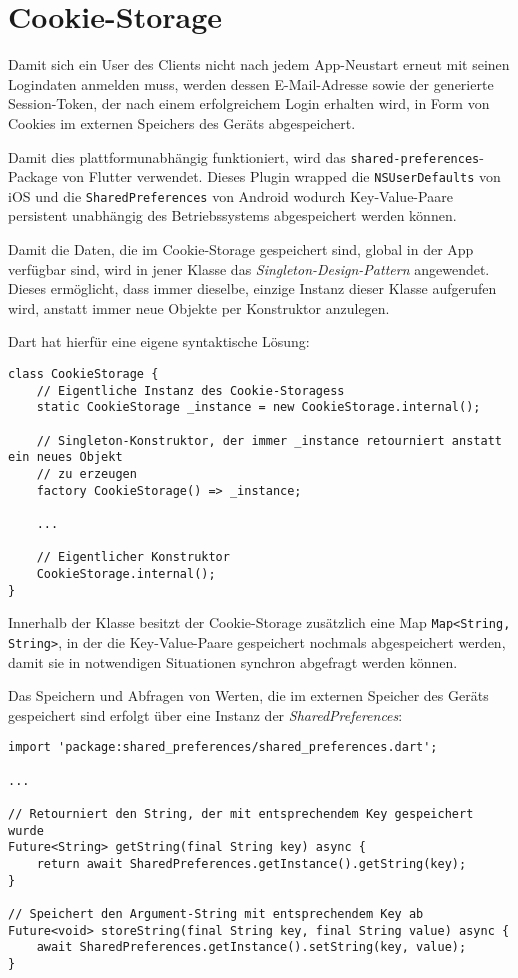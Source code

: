 \section{Cookie-Storage}

Damit sich ein User des Clients nicht nach jedem App-Neustart erneut mit seinen Logindaten anmelden muss,
werden dessen E-Mail-Adresse sowie der generierte Session-Token, der nach einem erfolgreichem Login erhalten wird, 
in Form von Cookies im externen Speichers des Geräts abgespeichert.


Damit dies plattformunabhängig funktioniert, wird das \lstinline{shared-preferences}-Package von Flutter
verwendet.
Dieses Plugin wrapped die \lstinline{NSUserDefaults} von iOS und die \lstinline{SharedPreferences} von Android
wodurch Key-Value-Paare persistent unabhängig des Betriebssystems abgespeichert werden können.

Damit die Daten, die im Cookie-Storage gespeichert sind, global in der App verfügbar sind, wird in jener
Klasse das \textit{Singleton-Design-Pattern} angewendet. Dieses ermöglicht, dass immer dieselbe, einzige Instanz
dieser Klasse aufgerufen wird, anstatt immer neue Objekte per Konstruktor anzulegen.

Dart hat hierfür eine eigene syntaktische Lösung:

\begin{lstlisting}
class CookieStorage {
    // Eigentliche Instanz des Cookie-Storagess
    static CookieStorage _instance = new CookieStorage.internal();

    // Singleton-Konstruktor, der immer _instance retourniert anstatt ein neues Objekt
    // zu erzeugen
    factory CookieStorage() => _instance;

    ...

    // Eigentlicher Konstruktor
    CookieStorage.internal();
}
\end{lstlisting}

Innerhalb der Klasse besitzt der Cookie-Storage zusätzlich eine Map \lstinline{Map<String, String>}, in der die Key-Value-Paare
gespeichert nochmals abgespeichert werden, damit sie in notwendigen Situationen synchron abgefragt werden können.

Das Speichern und Abfragen von Werten, die im externen Speicher des Geräts gespeichert sind erfolgt über
eine Instanz der \textit{SharedPreferences}:

\begin{lstlisting}
import 'package:shared_preferences/shared_preferences.dart';

...

// Retourniert den String, der mit entsprechendem Key gespeichert wurde
Future<String> getString(final String key) async {
    return await SharedPreferences.getInstance().getString(key);
}

// Speichert den Argument-String mit entsprechendem Key ab
Future<void> storeString(final String key, final String value) async {
    await SharedPreferences.getInstance().setString(key, value);
}
\end{lstlisting}

